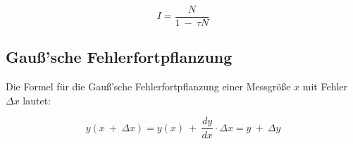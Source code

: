 \begin{equation}
    I = \frac{N}{1\ -\ \tau N}
    \label{eq:deadtime}
\end{equation}

\subsection{Gauß'sche Fehlerfortpflanzung}

Die Formel für die Gauß'sche Fehlerfortpflanzung einer Messgröße $x$ mit Fehler $\Delta x$ lautet:

\begin{equation}
    y(x\ +\ \Delta x) = y(x)\ +\ \frac{dy}{dx}\cdot \Delta x = y\ +\ \Delta y
    \label{eq:gauss}
\end{equation}